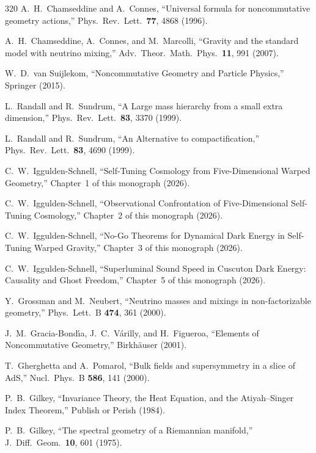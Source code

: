 \begin{thebibliography}{320}
A.~H.~Chamseddine and A.~Connes,
``Universal formula for noncommutative geometry actions,''
Phys.\ Rev.\ Lett.\ \textbf{77}, 4868 (1996).

A.~H.~Chamseddine, A.~Connes, and M.~Marcolli,
``Gravity and the standard model with neutrino mixing,''
Adv.\ Theor.\ Math.\ Phys.\ \textbf{11}, 991 (2007).

W.~D.~van Suijlekom,
``Noncommutative Geometry and Particle Physics,''
Springer (2015).

L.~Randall and R.~Sundrum,
``A Large mass hierarchy from a small extra dimension,''
Phys.\ Rev.\ Lett.\ \textbf{83}, 3370 (1999).

L.~Randall and R.~Sundrum,
``An Alternative to compactification,''
Phys.\ Rev.\ Lett.\ \textbf{83}, 4690 (1999).

C.~W.~Iggulden-Schnell,
``Self-Tuning Cosmology from Five-Dimensional Warped Geometry,''
Chapter~1 of this monograph (2026).

C.~W.~Iggulden-Schnell,
``Observational Confrontation of Five-Dimensional Self-Tuning Cosmology,''
Chapter~2 of this monograph (2026).

C.~W.~Iggulden-Schnell,
``No-Go Theorems for Dynamical Dark Energy in Self-Tuning Warped Gravity,''
Chapter~3 of this monograph (2026).

C.~W.~Iggulden-Schnell,
``Superluminal Sound Speed in Cuscuton Dark Energy: Causality and Ghost Freedom,''
Chapter~5 of this monograph (2026).

Y.~Grossman and M.~Neubert,
``Neutrino masses and mixings in non-factorizable geometry,''
Phys.\ Lett.\ B \textbf{474}, 361 (2000).

J.~M.~Gracia-Bond\'\i a, J.~C.~V\'arilly, and H.~Figueroa,
``Elements of Noncommutative Geometry,''
Birkh\"auser (2001).

T.~Gherghetta and A.~Pomarol,
``Bulk fields and supersymmetry in a slice of AdS,''
Nucl.\ Phys.\ B \textbf{586}, 141 (2000).

P.~B.~Gilkey,
``Invariance Theory, the Heat Equation, and the Atiyah--Singer Index Theorem,''
Publish or Perish (1984).

P.~B.~Gilkey,
``The spectral geometry of a Riemannian manifold,''
J.\ Diff.\ Geom.\ \textbf{10}, 601 (1975).


\end{thebibliography}
